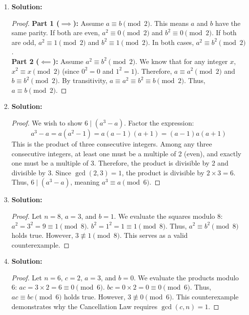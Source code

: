 \documentclass{article}
\begin{document}
\begin{enumerate}
    \item \textbf{Solution:}
    \begin{proof}
        \textbf{Part 1 ($\implies$):} Assume $a \equiv b \pmod 2$. This means $a$ and $b$ have the same parity. If both are even, $a^2 \equiv 0 \pmod 2$ and $b^2 \equiv 0 \pmod 2$. If both are odd, $a^2 \equiv 1 \pmod 2$ and $b^2 \equiv 1 \pmod 2$. In both cases, $a^2 \equiv b^2 \pmod 2$. \\
        \textbf{Part 2 ($\impliedby$):} Assume $a^2 \equiv b^2 \pmod 2$. We know that for any integer $x$, $x^2 \equiv x \pmod 2$ (since $0^2=0$ and $1^2=1$). Therefore, $a \equiv a^2 \pmod 2$ and $b \equiv b^2 \pmod 2$. By transitivity, $a \equiv a^2 \equiv b^2 \equiv b \pmod 2$. Thus, $a \equiv b \pmod 2$.
    \end{proof}

    \item \textbf{Solution:}
    \begin{proof}
        We wish to show $6 \mid (a^3 - a)$. Factor the expression:
        \[ a^3 - a = a(a^2 - 1) = a(a - 1)(a + 1) = (a - 1)a(a + 1) \]
        This is the product of three consecutive integers. Among any three consecutive integers, at least one must be a multiple of 2 (even), and exactly one must be a multiple of 3. Therefore, the product is divisible by 2 and divisible by 3. Since $\gcd(2, 3) = 1$, the product is divisible by $2 \times 3 = 6$. Thus, $6 \mid (a^3 - a)$, meaning $a^3 \equiv a \pmod 6$.
    \end{proof}

    \item \textbf{Solution:}
    \begin{proof}
        Let $n = 8$, $a = 3$, and $b = 1$. We evaluate the squares modulo 8:
        $a^2 = 3^2 = 9 \equiv 1 \pmod 8$.
        $b^2 = 1^2 = 1 \equiv 1 \pmod 8$.
        Thus, $a^2 \equiv b^2 \pmod 8$ holds true. However, $3 \not\equiv 1 \pmod 8$. This serves as a valid counterexample.
    \end{proof}

    \item \textbf{Solution:}
    \begin{proof}
        Let $n = 6$, $c = 2$, $a = 3$, and $b = 0$. We evaluate the products modulo 6:
        $ac = 3 \times 2 = 6 \equiv 0 \pmod 6$.
        $bc = 0 \times 2 = 0 \equiv 0 \pmod 6$.
        Thus, $ac \equiv bc \pmod 6$ holds true. However, $3 \not\equiv 0 \pmod 6$. This counterexample demonstrates why the Cancellation Law requires $\gcd(c, n) = 1$.
    \end{proof}


\end{enumerate}
\end{document}
